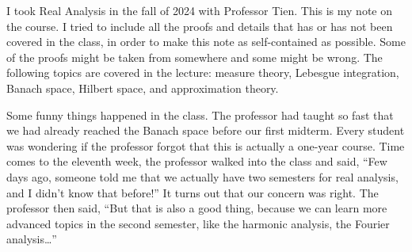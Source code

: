 I took Real Analysis in the fall of 2024 with Professor Tien. This is my 
note on the course. I tried to include all the proofs and details that has 
or has not been covered in the class, in order to make this note as 
self-contained as possible. Some of the proofs might be taken from 
somewhere and some might be wrong. The following topics are covered in 
the lecture: measure theory, Lebesgue integration, Banach space,  
Hilbert space, and approximation theory.

Some funny things happened in the class. The professor had taught so 
fast that we had already reached the Banach space before our first 
midterm. Every student was wondering if the professor forgot that this 
is actually a one-year course. Time comes to the eleventh week, the 
professor walked into the class and said, ``Few days ago, someone told 
me that we actually have two semesters for real analysis, and I didn't 
know that before!'' It turns out that our concern was right. The professor 
then said, ``But that is also a good thing, because we can learn more 
advanced topics in the second semester, like the harmonic analysis, 
the Fourier analysis\ldots'' 